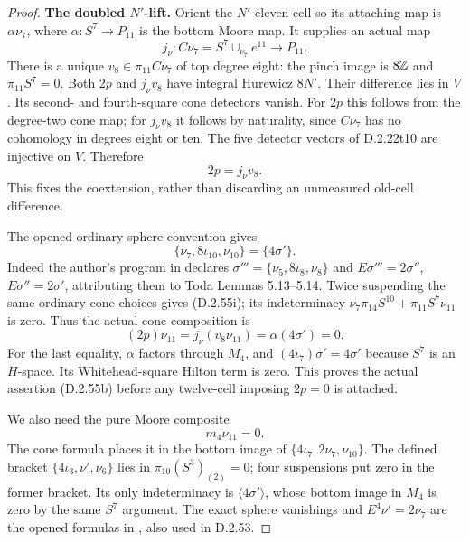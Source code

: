 \begin{proof}
\textbf{The doubled $N'$-lift.}
Orient the $N'$ eleven-cell so its attaching map is
$\alpha\nu_7$, where $\alpha:S^7\to P_{11}$ is the
bottom Moore map.  It supplies an actual map
\[
             j_\nu:C\nu_7=S^7\cup_{\nu_7}e^{11}
                         \longrightarrow P_{11}.
                         \tag{D.2.55g}
\]
There is a unique $v_8\in\pi_{11}C\nu_7$ of top
degree eight: the pinch image is $8\mathbb Z$ and
$\pi_{11}S^7=0$.  Both $2p$ and $j_\nu v_8$ have
integral Hurewicz $8N'$.  Their difference lies in $V$.
Its second- and fourth-square cone detectors vanish.
For $2p$ this follows from the degree-two cone map;
for $j_\nu v_8$ it follows by naturality, since
$C\nu_7$ has no cohomology in degrees eight or ten.
The five detector vectors of D.2.22t10 are injective
on $V$.  Therefore
\[
                            2p=j_\nu v_8.
                            \tag{D.2.55h}
\]
This fixes the coextension, rather than discarding an
unmeasured old-cell difference.

The opened ordinary sphere convention gives
\[
       \{\nu_7,8\iota_{10},\nu_{10}\}=\{4\sigma'\}.
       \tag{D.2.55i}
\]
Indeed the author's program in \cite{FGHStricklandToda}
declares $\sigma'''=\{\nu_5,8\iota_8,\nu_8\}$ and
$E\sigma'''=2\sigma''$, $E\sigma''=2\sigma'$,
attributing them to Toda Lemmas 5.13--5.14.
Twice suspending the same ordinary cone choices gives
\textup{(D.2.55i)}; its indeterminacy
$\nu_7\pi_{14}S^{10}+\pi_{11}S^7\nu_{11}$ is zero.
Thus the actual cone composition is
\[
 (2p)\nu_{11}=j_\nu(v_8\nu_{11})
             =\alpha(4\sigma')=0.
             \tag{D.2.55j}
\]
For the last equality, $\alpha$ factors through $M_4$,
and $(4\iota_7)\sigma'=4\sigma'$ because $S^7$ is an
$H$-space.  Its Whitehead-square Hilton term is zero.
This proves the actual assertion \textup{(D.2.55b)}
before any twelve-cell imposing $2p=0$ is attached.

We also need the pure Moore composite
\[
                            m_4\nu_{11}=0.
                            \tag{D.2.55k}
\]
The cone formula places it in the bottom image of
$\{4\iota_7,2\nu_7,\nu_{10}\}$.
The defined bracket $\{4\iota_3,\nu',\nu_6\}$ lies
in $\pi_{10}(S^3)_{(2)}=0$; four suspensions put zero
in the former bracket.  Its only indeterminacy is
$\langle4\sigma'\rangle$, whose bottom image in $M_4$
is zero by the same $S^7$ argument.
The exact sphere vanishings and $E^4\nu'=2\nu_7$
are the opened formulas in \cite{FGHStricklandToda},
also used in D.2.53.


\end{proof}
